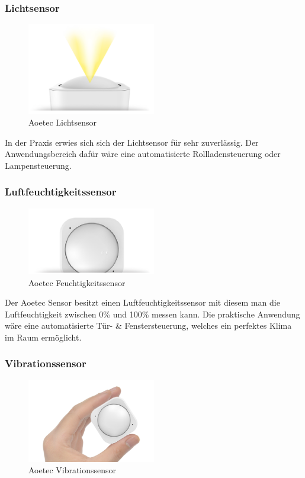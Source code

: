 \subsubsection{Lichtsensor}
\begin{figure}[h!]
	\centering
	\includegraphics[width=0.5\textwidth]{img/Sensorevaluation/AeoLight.png}
	\caption{Aoetec Lichtsensor}
	\label{fig:sensorenAeoLight}
\end{figure}

In der Praxis erwies sich sich der Lichtsensor für sehr zuverlässig. Der Anwendungsbereich dafür wäre eine automatisierte Rollladensteuerung oder Lampensteuerung.

\subsubsection{Luftfeuchtigkeitssensor}
\begin{figure}[h!]
	\centering
	\includegraphics[width=0.5\textwidth]{img/Sensorevaluation/AeoHum.png}
	\caption{Aoetec Feuchtigkeitssensor}
	\label{fig:sensorenAeoHum}
\end{figure}

Der Aoetec Sensor besitzt einen Luftfeuchtigkeitssensor mit diesem man die Luftfeuchtigkeit zwischen 0\% und 100\% messen kann. Die praktische Anwendung wäre eine automatisierte Tür- \& Fenstersteuerung, welches ein perfektes Klima im Raum ermöglicht.

\subsubsection{Vibrationssensor}
\begin{figure}[h!]
	\centering
	\includegraphics[width=0.5\textwidth]{img/Sensorevaluation/AeoVib.png}
	\caption{Aoetec Vibrationssensor}
	\label{fig:sensorenAeoVib}
\end{figure}

